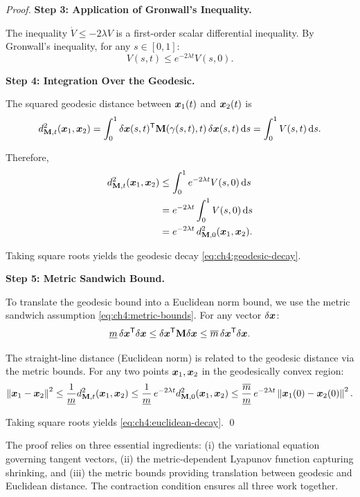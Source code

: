 \begin{proof}
\textbf{Step 3: Application of Gronwall's Inequality.}

The inequality $\dot{V} \leq -2\lambda V$ is a first-order scalar differential inequality.
By Gronwall's inequality, for any $s \in [0,1]$:
\begin{equation}
V(s,t) \leq e^{-2\lambda t} V(s,0).
\label{eq:ch4:gronwall-result}
\end{equation}

\textbf{Step 4: Integration Over the Geodesic.}

The squared geodesic distance between $\bm{x}_1(t)$ and $\bm{x}_2(t)$ is
\begin{equation}
d_{\mathbf{M},t}^2(\bm{x}_1,\bm{x}_2) = \int_0^1 \delta\bm{x}(s,t)^{\mathsf{T}} \mathbf{M}(\gamma(s,t),t) \, \delta\bm{x}(s,t) \, \mathrm{d} s
= \int_0^1 V(s,t) \, \mathrm{d} s.
\end{equation}

Therefore,
\begin{align}
d_{\mathbf{M},t}^2(\bm{x}_1,\bm{x}_2) &\leq \int_0^1 e^{-2\lambda t} V(s,0) \, \mathrm{d} s \\
&= e^{-2\lambda t} \int_0^1 V(s,0) \, \mathrm{d} s \\
&= e^{-2\lambda t} \, d_{\mathbf{M},0}^2(\bm{x}_1,\bm{x}_2).
\end{align}

Taking square roots yields the geodesic decay \eqref{eq:ch4:geodesic-decay}.

\textbf{Step 5: Metric Sandwich Bound.}

To translate the geodesic bound into a Euclidean norm bound, we use the metric sandwich
assumption \eqref{eq:ch4:metric-bounds}. For any vector $\delta\bm{x}$:
\begin{equation}
\underline{m}\,\delta\bm{x}^{\mathsf{T}}\delta\bm{x} \leq \delta\bm{x}^{\mathsf{T}}\mathbf{M}\delta\bm{x} \leq \overline{m}\,\delta\bm{x}^{\mathsf{T}}\delta\bm{x}.
\end{equation}

The straight-line distance (Euclidean norm) is related to the geodesic distance via the
metric bounds. For any two points $\bm{x}_1,\bm{x}_2$ in the geodesically convex region:
\begin{equation}
\left\lVert \bm{x}_1 - \bm{x}_2 \right\rVert^2 \leq \frac{1}{\underline{m}} d_{\mathbf{M},t}^2(\bm{x}_1,\bm{x}_2) \leq
\frac{1}{\underline{m}} \, e^{-2\lambda t} d_{\mathbf{M},0}^2(\bm{x}_1,\bm{x}_2)
\leq \frac{\overline{m}}{\underline{m}} \, e^{-2\lambda t} \left\lVert \bm{x}_1(0)-\bm{x}_2(0) \right\rVert^2.
\end{equation}

Taking square roots yields \eqref{eq:ch4:euclidean-decay}. \qed
\end{proof}

\begin{remark}
The proof relies on three essential ingredients: (i) the variational equation governing
tangent vectors, (ii) the metric-dependent Lyapunov function capturing shrinking, and
(iii) the metric bounds providing translation between geodesic and Euclidean distance.
The contraction condition ensures all three work together.
\end{remark}


